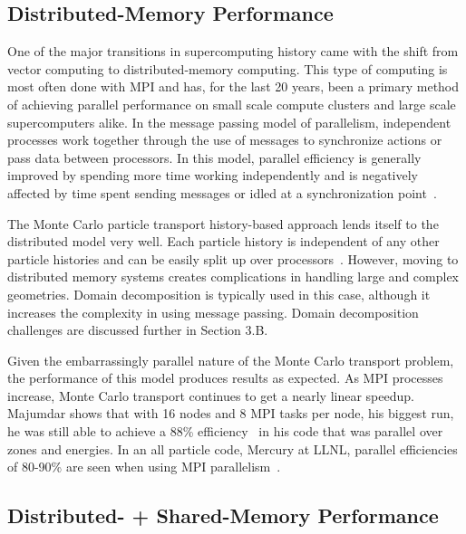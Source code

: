 \subsection*{ \textbf{Distributed-Memory Performance}}

One of the major transitions in supercomputing history came with the shift from vector computing to distributed-memory computing.
%
This type of computing is most often done with MPI and has, for the last 20 years, been a primary method of achieving parallel performance on small scale compute clusters and large scale supercomputers alike.
%
In the message passing model of parallelism, independent processes work together through the use of messages to synchronize actions or pass data between processors.
%
In this model, parallel efficiency is generally improved by spending more time working independently and is negatively affected by time spent sending messages or idled at a synchronization point~\cite{yanghybrid}.
%

%
The Monte Carlo particle transport history-based approach lends itself to the distributed model very well.
%
Each particle history is independent of any other particle histories and can be easily split up over processors~\cite{yanghybrid}.
%
However, moving to distributed memory systems creates complications in handling large and complex geometries.
%
Domain decomposition is typically used in this case, although it increases the complexity in using message passing.
%
Domain decomposition challenges are discussed further in Section 3.B.
%

%
Given the embarrassingly parallel nature of the Monte Carlo transport problem, the performance of this model produces results as expected.
%
As MPI processes increase, Monte Carlo transport continues to get a nearly linear speedup.
%
Majumdar shows that with 16 nodes and 8 MPI tasks per node, his biggest run, he was still able to achieve a 88\% efficiency~\cite{majumdar2000parallel} in his code that was parallel over zones and energies.
%
In an all particle code, Mercury at LLNL, parallel efficiencies of 80-90\% are seen when using MPI parallelism~\cite{procassini2005load}.

\subsection*{ \textbf{Distributed- + Shared-Memory Performance}}

